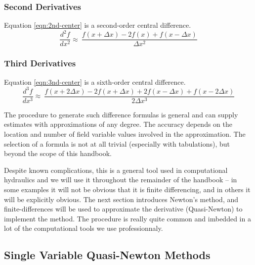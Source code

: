\subsubsection{Second Derivatives}
Equation \ref{eqn:2nd-center} is a second-order central difference.
\begin{equation}
\frac{d^2f}{dx^2}  \approx~ \frac{f(x + \Delta x) - 2f(x) + f(x -\Delta x)}{ \Delta x^2}
\label{eqn:2nd-center}
\end{equation}

\subsubsection{Third Derivatives}
Equation \ref{eqn:3nd-center} is a sixth-order central difference.
\begin{equation}
\frac{d^3f}{dx^3}  \approx~ \frac{f(x + 2\Delta x) -2f(x + \Delta x) + 2f(x -\Delta x) + f(x -2\Delta x)}{ 2 \Delta x^3}
\label{eqn:3nd-center}
\end{equation}

The procedure to generate such difference formulas is general and can supply estimates with approximations of any degree.  
The accuracy depends on the location and number of field variable values involved in the approximation.  
The selection of a formula is not at all trivial (especially with tabulations), but beyond the scope of this handbook.

Despite known complications, this is a general tool used in computational hydraulics and we will use it throughout the remainder of the handbook -- in some examples it will not be obvious that it is finite differencing, and in others it will be explicitly obvious.
The next section introduces Newton's method, and finite-differences will be used to approximate the derivative (Quasi-Newton) to implement the method.  The procedure is really quite common and imbedded in a lot of the computational tools we use professionnaly.
\clearpage

\subsection{Single Variable Quasi-Newton Methods}

